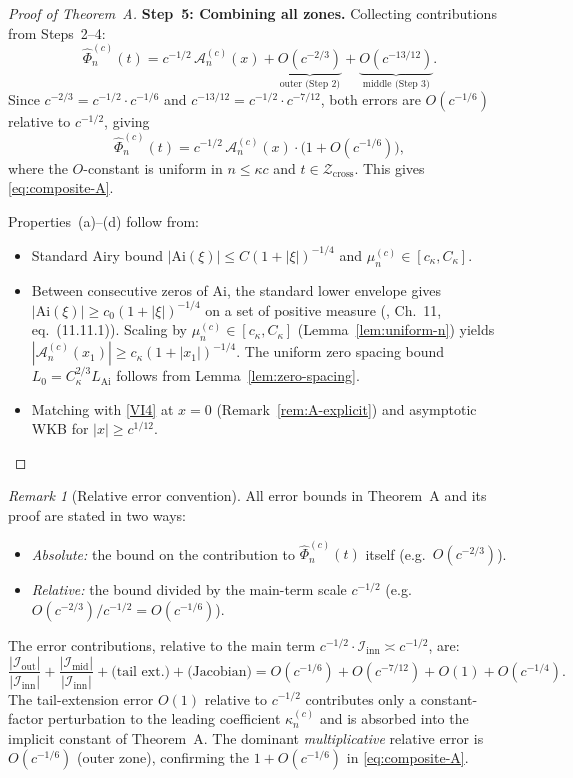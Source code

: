 \documentclass[12pt,a4paper]{amsart}
\theoremstyle{definition}
\theoremstyle{remark}
\newtheorem{remark}[theorem]{Remark}
\newcommand{\Ai}{\mathrm{Ai}}
\newcommand{\Zcross}{\mathcal{Z}_{\mathrm{cross}}}
\begin{document}
\begin{proof}[Proof of Theorem~A]
\medskip
\noindent\textbf{Step~5: Combining all zones.}
Collecting contributions from Steps~2--4:
\[
  \widehat{\Phi}_n^{(c)}(t)
  = c^{-1/2}\,\mathcal{A}_n^{(c)}(x)
  + \underbrace{O(c^{-2/3})}_{\text{outer (Step~2)}}
  + \underbrace{O(c^{-13/12})}_{\text{middle (Step~3)}}.
\]
Since $c^{-2/3} = c^{-1/2}\cdot c^{-1/6}$ and
$c^{-13/12} = c^{-1/2}\cdot c^{-7/12}$,
both errors are $O(c^{-1/6})$ relative to $c^{-1/2}$, giving
\[
  \widehat{\Phi}_n^{(c)}(t)
  = c^{-1/2}\,\mathcal{A}_n^{(c)}(x)
  \cdot\bigl(1 + O(c^{-1/6})\bigr),
\]
where the $O$-constant is uniform in $n \le \kappa c$
and $t \in \Zcross$.
This gives \eqref{eq:composite-A}.

Properties~(a)--(d) follow from:
\begin{itemize}
  \item[(a)] Standard Airy bound
        $|\Ai(\xi)| \le C(1+|\xi|)^{-1/4}$
        and $\mu_n^{(c)} \in [c_\kappa, C_\kappa]$.
  \item[(b)] Between consecutive zeros of $\Ai$,
        the standard lower envelope gives
        $|\Ai(\xi)| \ge c_0 (1+|\xi|)^{-1/4}$
        on a set of positive measure
        (\cite{Olver1974}, Ch.~11, eq.~(11.11.1)).
        Scaling by $\mu_n^{(c)} \in [c_\kappa, C_\kappa]$
        (Lemma~\ref{lem:uniform-n})
        yields $|\mathcal{A}_n^{(c)}(x_1)| \ge c_\kappa(1+|x_1|)^{-1/4}$.
        The uniform zero spacing bound $L_0 = C_\kappa^{2/3}L_{\Ai}$
        follows from Lemma~\ref{lem:zero-spacing}.
  \item[(c),(d)] Matching with \eqref{VI4}
        at $x = 0$ (Remark~\ref{rem:A-explicit})
        and asymptotic WKB for $|x| \ge c^{1/12}$.
\end{itemize}
\end{proof}

\begin{remark}[Relative error convention]
\label{rem:relative-error}
All error bounds in Theorem~A and its proof are
stated in two ways:
\begin{itemize}
\item \emph{Absolute:} the bound on the contribution
  to $\widehat{\Phi}_n^{(c)}(t)$ itself
  (e.g.\ $O(c^{-2/3})$).
\item \emph{Relative:} the bound divided by the
  main-term scale $c^{-1/2}$
  (e.g.\ $O(c^{-2/3})/c^{-1/2} = O(c^{-1/6})$).
\end{itemize}
The error contributions, relative to the main term
$c^{-1/2} \cdot \mathcal{I}_{\mathrm{inn}} \asymp c^{-1/2}$, are:
\[
\frac{|\mathcal{I}_{\mathrm{out}}|}{|\mathcal{I}_{\mathrm{inn}}|}
+ \frac{|\mathcal{I}_{\mathrm{mid}}|}{|\mathcal{I}_{\mathrm{inn}}|}
+ \text{(tail ext.)}
+ \text{(Jacobian)}
= O(c^{-1/6}) + O(c^{-7/12}) + O(1) + O(c^{-1/4}).
\]
The tail-extension error $O(1)$ relative to $c^{-1/2}$
contributes only a constant-factor perturbation
to the leading coefficient $\kappa_n^{(c)}$
and is absorbed into the implicit constant of Theorem~A.
The dominant \emph{multiplicative} relative error
is $O(c^{-1/6})$ (outer zone), confirming
the $1 + O(c^{-1/6})$ in \eqref{eq:composite-A}.
\end{remark}
\end{document}

